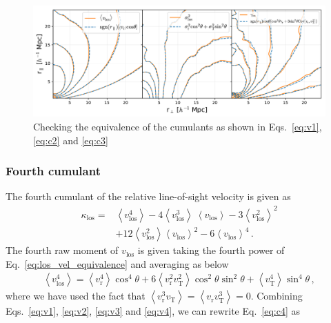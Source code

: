 \documentclass[a4paper,fleqn,usenatbib]{mnras}
\begin{document}
	\begin{figure}
	\centering
	\includegraphics[scale=0.7]{cumulants}
	\caption{Checking the equivalence of the cumulants as shown in Eqs.~\ref{eq:v1}, \ref{eq:c2} and \ref{eq:c3}}
	\label{fig:cumulants}
\end{figure}
	\subsubsection{Fourth cumulant}
	The fourth cumulant of the relative line-of-sight velocity is given as
	\begin{eqnarray}\label{eq:c4}
		\kappa_{\mathrm{los}}  = & \left\langle v^4_{\mathrm{los}}\right\rangle - 4\left\langle v^3_{\mathrm{los}}\right\rangle\ \left\langle v_{\mathrm{los}}\right\rangle - 3\left\langle v^2_{\mathrm{los}}\right\rangle^2 \nonumber \\
		& + 12\left\langle v^2_{\mathrm{los}}\right\rangle\left\langle v_{\mathrm{los}}\right\rangle^2 - 6\left\langle v_{\mathrm{los}}\right\rangle^4 \, .
	\end{eqnarray}
	The fourth raw moment of $v_{\mathrm{los}}$ is given taking the fourth power of Eq.~\ref{eq:los_vel_equivalence} and averaging as below
	\begin{eqnarray}\label{eq:v4}
		\left\langle v^4_{\mathrm{los}}\right\rangle = \left\langle v^4_{\mathrm{r}}\right\rangle\cos^4\theta + 6\left\langle v^2_{\mathrm{r}}v^2_{\mathrm{T}}\right\rangle  \cos^2\theta\sin^2\theta + \left\langle v^4_{\mathrm{T}}\right\rangle\sin^4\theta \, ,
	\end{eqnarray}
	\noindent where we have used the fact that $\left\langle v^3_{\mathrm{r}}v_{\mathrm{T}}\right\rangle = \left\langle v_{\mathrm{r}}v^3_{\mathrm{T}}\right\rangle = 0$. Combining Eqs.~\ref{eq:v1}, \ref{eq:v2}, \ref{eq:v3} and \ref{eq:v4}, we can rewrite Eq.~\ref{eq:c4} as
\end{document}
